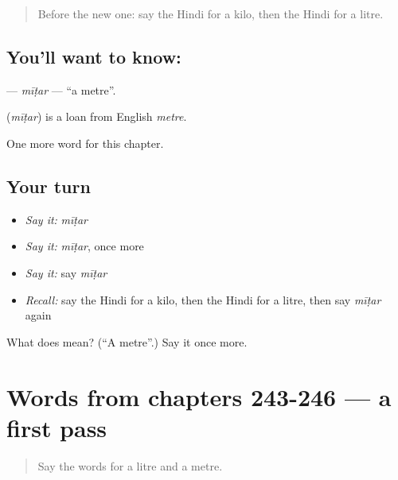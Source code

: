 \label{lesson:HI-C251-mitar}



\begin{quote}
Before the new one: say the Hindi for a kilo, then the Hindi for a litre.
\end{quote}

\subsection*{You'll want to know: }
\textbf{} — \emph{mīṭar} — \textquotedblleft{}a metre\textquotedblright{}.

\begin{cousinweb}
\textbf{} (\emph{mīṭar}) is a loan from English \emph{metre}.
\end{cousinweb}

\begin{grammarlens}[title={What you've built}]
One more word for this chapter.
\end{grammarlens}

\subsection*{Your turn}
\begin{itemize}
\raggedright
  \item \emph{Say it:} \emph{mīṭar}
  \item \emph{Say it:} \emph{mīṭar}, once more
  \item \emph{Say it:} say \emph{mīṭar}
  \item \emph{Recall:} say the Hindi for a kilo, then the Hindi for a litre, then say \emph{mīṭar} again
\end{itemize}

\begin{tcolorbox}[breakable,colback=teal!4,colframe=teal!35!black,title={Before you move on}]
What does  mean? (\textquotedblleft{}A metre\textquotedblright{}.) Say it once more.
\end{tcolorbox}
\section[(dialogue)]{Words from chapters 243-246 — a first pass}

\label{lesson:HI-R251-first-pass-words-from-chapters-243-246}



\begin{quote}
Say the words for a litre and a metre.
\end{quote}

